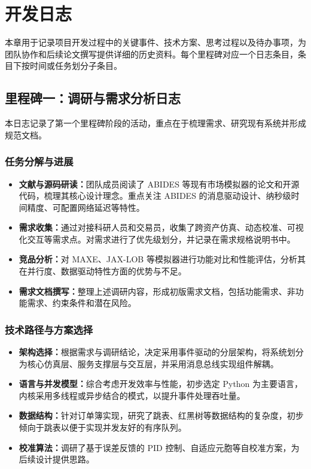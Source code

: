 \section{开发日志}

本章用于记录项目开发过程中的关键事件、技术方案、思考过程以及待办事项，为团队协作和后续论文撰写提供详细的历史资料。每个里程碑对应一个日志条目，条目下按时间或任务划分子条目。

\subsection{里程碑一：调研与需求分析日志}

本日志记录了第一个里程碑阶段的活动，重点在于梳理需求、研究现有系统并形成规范文档。

\subsubsection{任务分解与进展}

\begin{itemize}
  \item \textbf{文献与源码研读：}团队成员阅读了 ABIDES 等现有市场模拟器的论文和开源代码，梳理其核心设计理念。重点关注 ABIDES 的消息驱动设计、纳秒级时间精度、可配置网络延迟等特性。
  \item \textbf{需求收集：}通过对接科研人员和交易员，收集了跨资产仿真、动态校准、可视化交互等需求点。对需求进行了优先级划分，并记录在需求规格说明书中。
  \item \textbf{竞品分析：}对 MAXE、JAX-LOB 等模拟器进行功能对比和性能评估，分析其在并行度、数据驱动特性方面的优势与不足。
  \item \textbf{需求文档撰写：}整理上述调研内容，形成初版需求文档，包括功能需求、非功能需求、约束条件和潜在风险。
\end{itemize}

\subsubsection{技术路径与方案选择}

\begin{itemize}
  \item \textbf{架构选择：}根据需求与调研结论，决定采用事件驱动的分层架构，将系统划分为核心仿真层、服务支撑层与交互层，并采用消息总线实现组件解耦。
  \item \textbf{语言与并发模型：}综合考虑开发效率与性能，初步选定 Python 为主要语言，内核采用多线程或异步结合的模式，以提升事件处理吞吐量。
  \item \textbf{数据结构：}针对订单簿实现，研究了跳表、红黑树等数据结构的复杂度，初步倾向于跳表以便于实现并发友好的有序队列。
  \item \textbf{校准算法：}调研了基于误差反馈的 PID 控制、自适应元胞等自校准方案，为后续设计提供思路。
\end{itemize}

